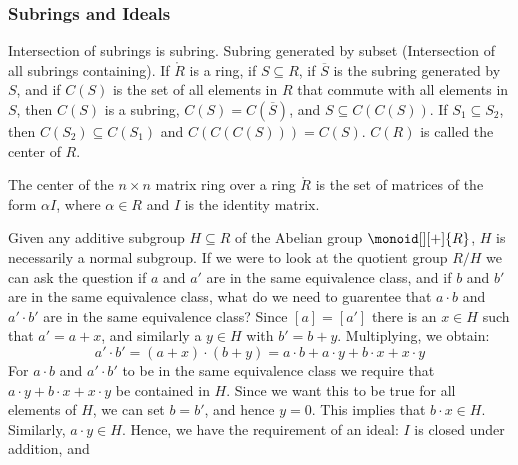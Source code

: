 \documentclass{article}                                                        %
\begin{document}
            \subsubsection{Subrings and Ideals}
                Intersection of subrings is subring. Subring generated by
                subset (Intersection of all subrings containing).
                If $\ring{R}$ is a ring, if $S\subseteq{R}$, if $\overline{S}$
                is the subring generated by $S$, and if $C(S)$ is the set of
                all elements in $R$ that commute with all elements in $S$,
                then $C(S)$ is a subring, $C(S)=C(\overline{S})$, and
                $S\subseteq{C}(C(S))$. If $S_{1}\subseteq{S}_{2}$, then
                $C(S_{2})\subseteq{C}(S_{1})$ and
                $C(C(C(S)))=C(S)$. $C(R)$ is called the center of $R$.
                \begin{example}
                    The center of the $n\times{n}$ matrix ring over a ring
                    $\ring{R}$ is the set of matrices of the form $\alpha{I}$,
                    where $\alpha\in{R}$ and $I$ is the identity matrix.
                \end{example}
                Given any additive subgroup $H\subseteq{R}$ of the Abelian
                group $\monoid[][+]{R}$, $H$ is necessarily a normal subgroup.
                If we were to look at the quotient group $R/H$ we can ask the
                question if $a$ and $a'$ are in the same equivalence class, and
                if $b$ and $b'$ are in the same equivalence class, what do we
                need to guarentee that $a\cdot{b}$ and $a'\cdot{b}'$ are in the
                same equivalence class? Since $[a]=[a']$ there is an $x\in{H}$
                such that $a'=a+x$, and similarly a $y\in{H}$ with $b'=b+y$.
                Multiplying, we obtain:
                \begin{equation}
                    a'\cdot{b}'=(a+x)\cdot(b+y)
                        =a\cdot{b}+a\cdot{y}+b\cdot{x}+x\cdot{y}
                \end{equation}
                For $a\cdot{b}$ and $a'\cdot{b}'$ to be in the same equivalence
                class we require that $a\cdot{y}+b\cdot{x}+x\cdot{y}$ be
                contained in $H$. Since we want this to be true for all elements
                of $H$, we can set $b=b'$, and hence $y=0$. This implies that
                $b\cdot{x}\in{H}$. Similarly, $a\cdot{y}\in{H}$. Hence, we have
                the requirement of an ideal: $I$ is closed under addition, and
\end{document}
